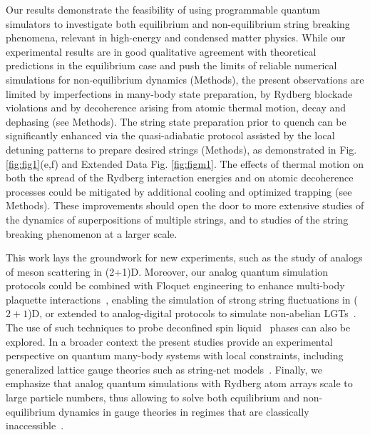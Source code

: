 \documentclass[footinbib,a4paper,aps,superscriptaddress,twocolumn,preprintnumbers,amsmath,amssymb,nobalancelastpage,10pt,prl]{revtex4-2}
\begin{document}
Our results demonstrate the feasibility of using programmable quantum simulators to investigate both equilibrium and non-equilibrium string breaking phenomena, relevant in high-energy and condensed matter physics. While our experimental results are in good qualitative agreement with theoretical predictions in the equilibrium case and push the limits of reliable numerical simulations for non-equilibrium dynamics (Methods),  the present observations are limited by imperfections
in many-body state preparation, by Rydberg blockade violations and by decoherence arising from atomic thermal motion,  decay and dephasing  
(see Methods). The string state preparation prior to quench can be significantly enhanced via the quasi-adiabatic protocol assisted by the local detuning patterns to prepare desired strings (Methods), as demonstrated in Fig. \ref{fig:fig1}(e,f) and Extended Data Fig. \ref{fig:figm1}. %
The effects of thermal motion on both the spread of the Rydberg interaction energies and on atomic decoherence processes  could be mitigated by additional cooling and optimized trapping  (see Methods). These improvements should open the door to more extensive studies of the dynamics of superpositions of multiple strings, and to studies of the string breaking phenomenon at a larger scale.

This work lays the groundwork for new experiments, such as the study of analogs of meson scattering in (2+1)D. Moreover, our analog quantum simulation protocols could be combined with Floquet engineering to enhance multi-body plaquette interactions~\cite{Feldmeier_2024}, enabling the simulation of strong string fluctuations in ($2+1$)D, or extended to analog-digital protocols to simulate non-abelian LGTs~\cite{Gonzalez-Cuadra_2022, Zache_2023_1, Maskara_2023}. The use of such techniques to probe deconfined spin liquid~\cite{Verresen_2021,PhysRevLett.130.043601,Semeghini_2021} phases can also be explored. In a broader context the present studies provide an experimental perspective on quantum many-body systems with local constraints, including generalized lattice gauge theories such as string-net models~\cite{Levin_2005}. Finally, we emphasize that analog quantum simulations with Rydberg atom arrays scale to large particle numbers, thus allowing to solve both equilibrium and non-equilibrium dynamics in gauge theories in regimes that are classically inaccessible~\cite{Bauer2023}.
\end{document}
